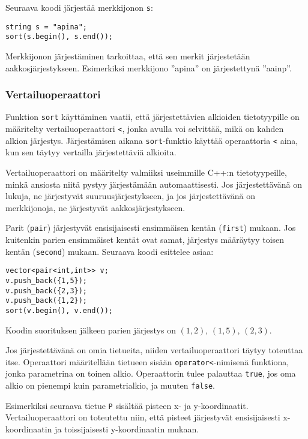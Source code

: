 Seuraava koodi järjestää merkkijonon \texttt{s}:

\begin{lstlisting}
string s = "apina";
sort(s.begin(), s.end());
\end{lstlisting}

Merkkijonon järjestäminen tarkoittaa,
että sen merkit järjestetään aakkosjärjestykseen.
Esimerkiksi merkkijono ''apina''
on järjestettynä ''aainp''.

\subsubsection{Vertailuoperaattori}

Funktion \texttt{sort} käyttäminen vaatii,
että järjestettävien alkioiden
tietotyypille on määritelty vertailuoperaattori \texttt{<},
jonka avulla voi selvittää, mikä on kahden alkion järjestys.
Järjestämisen aikana \texttt{sort}-funktio
käyttää operaattoria \texttt{<} aina, kun sen täytyy
vertailla järjestettäviä alkioita.

Vertailuoperaattori on määritelty valmiiksi
useimmille C++:n tietotyypeille,
minkä ansiosta niitä pystyy järjestämään automaattisesti.
Jos järjestettävänä on lukuja, ne järjestyvät
suuruusjärjestykseen,
ja jos järjestettävänä on merkkijonoja,
ne järjestyvät aakkosjärjestykseen.

Parit (\texttt{pair}) järjestyvät ensisijaisesti
ensimmäisen kentän (\texttt{first}) mukaan.
Jos kuitenkin parien ensimmäiset kentät ovat samat,
järjestys määräytyy toisen kentän (\texttt{second}) mukaan.
Seuraava koodi esittelee asiaa:

\begin{lstlisting}
vector<pair<int,int>> v;
v.push_back({1,5});
v.push_back({2,3});
v.push_back({1,2});
sort(v.begin(), v.end());
\end{lstlisting}

Koodin suorituksen jälkeen parien järjestys on
$(1,2)$, $(1,5)$, $(2,3)$.

Jos järjestettävänä on omia tietueita,
niiden vertailuoperaattori täytyy toteuttaa itse.
Operaattori määritellään tietueen sisään
\texttt{operator<}-nimisenä funktiona,
jonka parametrina on toinen alkio.
Operaattorin tulee palauttaa \texttt{true},
jos oma alkio on pienempi kuin parametrialkio,
ja muuten \texttt{false}.

Esimerkiksi seuraava tietue \texttt{P}
sisältää pisteen x- ja y-koordinaatit.
Vertailuoperaattori on toteutettu niin,
että pisteet järjestyvät ensisijaisesti x-koor\-di\-naa\-tin
ja toissijaisesti y-koordinaatin mukaan.

